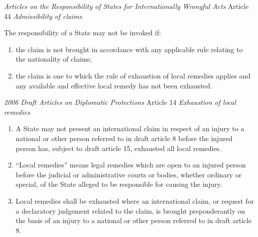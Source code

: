 \begin{conventiondetails}{\textit{Articles on the Responsibility of States for Internationally Wrongful Acts} Article 44}
    \flushleft
    \textit{Admissibility of claims}

    \vspace{\baselineskip}

    The responsibility of a State may not be invoked if: 
    \begin{enumerate}[label=(\alph*)]
        \item the claim is not brought in accordance with any applicable rule relating to the nationality of claims;
        \item the claim is one to which the rule of exhaustion of local remedies applies and any available and effective local remedy has not been exhausted.
    \end{enumerate}    
\end{conventiondetails}

\begin{conventiondetails}{\textit{2006 Draft Articles on Diplomatic Protections} Article 14}
    \flushleft
    \textit{Exhaustion of local remedies}

    \begin{enumerate}
        \item A State may not present an international claim in respect of an injury to a national or other person referred to in draft article 8 before the injured person has, subject to draft article 15, exhausted all local remedies. 
        \item ``Local remedies” means legal remedies which are open to an injured person before the judicial or administrative courts or bodies, whether ordinary or special, of the State alleged to be responsible for causing the injury. 
        \item Local remedies shall be exhausted where an international claim, or request for a declaratory judgement related to the claim, is brought preponderantly on the basis of an injury to a national or other person referred to in draft article 8. 
    \end{enumerate}
\end{conventiondetails}

